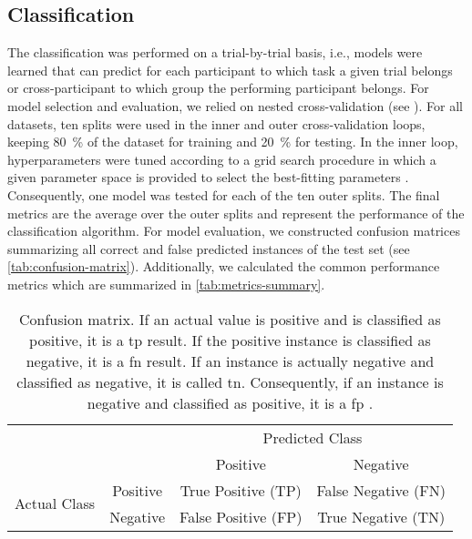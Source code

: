 \subsection{Classification}
The classification was performed on a trial-by-trial basis, i.e., models were learned that can predict for each participant to which task a given trial belongs or cross-participant to which group the performing participant belongs. For model selection and evaluation, we relied on nested cross-validation (see ). For all datasets, ten splits were used in the inner and outer cross-validation loops, keeping 80~\% of the dataset for training and 20~\% for testing. In the inner loop, hyperparameters were tuned according to a grid search procedure in which a given parameter space is provided to select the best-fitting parameters \cite{Varoquaux2017}. Consequently, one model was tested for each of the ten outer splits. The final metrics are the average over the outer splits and represent the performance of the classification algorithm. For model evaluation, we constructed confusion matrices summarizing all correct and false predicted instances of the test set \cite{Fawcett2006} (see \autoref{tab:confusion-matrix}). Additionally, we calculated the common performance metrics which are summarized in \autoref{tab:metrics-summary}.

\begin{table}[ht]
    \captionsetup{justification=raggedright,singlelinecheck=false}
    \caption[Confusion matrix]{Confusion matrix. If an actual value is positive and is classified as positive, it is a \gls{tp} result. If the positive instance is classified as negative, it is a \gls{fn} result. If an instance is actually negative and classified as negative, it is called \gls{tn}. Consequently, if an instance is negative and classified as positive, it is a \gls{fp} \cite{Fawcett2006}.}
    \label{tab:confusion-matrix}
    \renewcommand{\arraystretch}{1.25}
    \centering
        \begin{tabular}{cc|c|c|}
            \cline{3-4}
            & & \multicolumn{2}{c|}{Predicted Class} \\ \cline{3-4} 
            & & Positive & Negative \\ \hline
            \multicolumn{1}{|c|}{\multirow{2}{*}{Actual Class}} & Positive & True Positive (TP) & False Negative (FN) \\ \cline{2-4} 
            \multicolumn{1}{|c|}{} & Negative & False Positive (FP) & True Negative (TN) \\ \hline
        \end{tabular}
\end{table}

